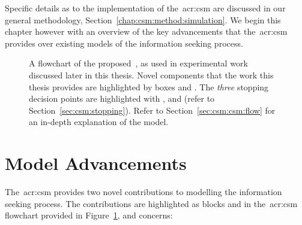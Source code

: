 Specific details as to the implementation of the~\gls{acr:csm} are discussed in our general methodology, Section~\ref{chap:csm:method:simulation}. We begin this chapter however with an overview of the key advancements that the~\gls{acr:csm} provides over existing models of the information seeking process.

\begin{figure}[t!]
    \centering
    \caption[Flowchart of the~]{A flowchart of the proposed~, as used in experimental work discussed later in this thesis. Novel components that the work this thesis provides are highlighted by boxes  and . The \emph{three} stopping decision points are highlighted with ,  and  (refer to Section~\ref{sec:csm:stopping}). Refer to Section~\ref{sec:csm:csm:flow} for an in-depth explanation of the model.}
    \label{fig:csm}
\end{figure}

\section{Model Advancements}\label{sec:csm:csm:advancements}
The~\gls{acr:csm} provides two novel contributions to modelling the information seeking process. The contributions are highlighted as blocks  and  in the~\gls{acr:csm} flowchart provided in Figure~\ref{fig:csm}, and concerns:

